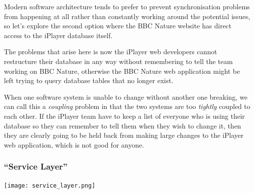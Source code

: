 \documentclass{beamer}
\begin{document}
{  Modern software architecture tends to prefer to prevent synchronisation
  problems from happening at all rather than constantly working around
  the potential issues, so let's explore the second option where the BBC
  Nature website has direct access to the iPlayer database itself.

  The problems that arise here is now the iPlayer web developers cannot
  restructure their database in any way without remembering to tell
  the team working on BBC Nature, otherwise the BBC Nature web application
  might be left trying to query database tables that no longer exist.

  When one software system is unable to change without another one breaking,
  we can call this a \emph{coupling} problem in that the two systems
  are too \emph{tightly} coupled to each other. If the iPlayer team have to
  keep a list of everyone who is using their database so they can remember
  to tell them when they wish to change it, then they are clearly going to
  be held back from making large changes to the iPlayer web application, which
  is not good for anyone.

}

\begin{frame}
  \frametitle{``Service Layer''}
  \centering
  \texttt{[image: service\_layer.png]}\\
\end{frame}
\end{document}
